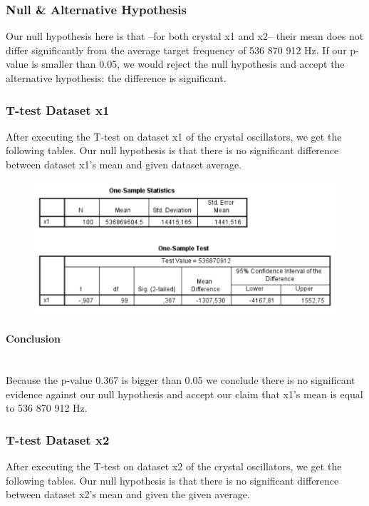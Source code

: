 \documentclass[14]{article}
\begin{document}
\subsubsection{Null \& Alternative Hypothesis}%
Our null hypothesis here is that --for both crystal x1 and x2-- their mean does not differ significantly from the average target frequency of 536 870 912 Hz. If our p-value is smaller than 0.05, we would reject the null hypothesis and accept the alternative hypothesis: the difference is significant.

\subsubsection{T-test Dataset x1}
After executing the T-test on dataset x1 of the crystal oscillators, we get the following tables. Our null hypothesis is that there is no significant difference between dataset x1's mean and given dataset average.

\begin{figure}[!htb]
	\includegraphics[width=1.0\textwidth]{img/question1/question1_x1_T.PNG}
	\captionsetup{width=1.0\textwidth}
	\centering 
\end{figure}

\paragraph{Conclusion}\mbox{}\\
Because the p-value 0.367 is bigger than 0.05 we conclude there is no significant evidence against our null hypothesis and accept our claim that x1's mean is equal to 536 870 912 Hz.


\subsubsection{T-test Dataset x2}
After executing the T-test on dataset x2 of the crystal oscillators, we get the following tables. Our null hypothesis is that there is no significant difference between dataset x2's mean and given the given average.
\end{document}
